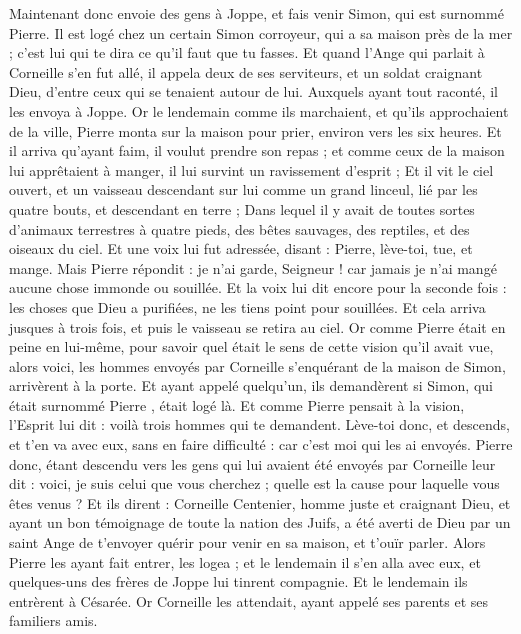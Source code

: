 \begin{multicols}{2}
Maintenant donc envoie des gens à Joppe, et fais venir Simon, qui est surnommé Pierre.
Il est logé chez un certain Simon corroyeur, qui a sa maison près de la mer ; c'est lui qui te dira ce qu'il faut que tu fasses.
Et quand l'Ange qui parlait à Corneille s'en fut allé, il appela deux de ses serviteurs, et un soldat craignant Dieu, d'entre ceux qui se tenaient autour de lui.
Auxquels ayant tout raconté, il les envoya à Joppe.
Or le lendemain comme ils marchaient, et qu'ils approchaient de la ville, Pierre monta sur la maison pour prier, environ vers les six heures.
Et il arriva qu'ayant faim, il voulut prendre son repas ; et comme ceux de la maison lui apprêtaient à manger, il lui survint un ravissement d'esprit ;
Et il vit le ciel ouvert, et un vaisseau descendant sur lui comme un grand linceul, lié par les quatre bouts, et descendant en terre ;
Dans lequel il y avait de toutes sortes d'animaux terrestres à quatre pieds, des bêtes sauvages, des reptiles, et des oiseaux du ciel.
Et une voix lui fut adressée, disant : Pierre, lève-toi, tue, et mange.
Mais Pierre répondit : je n'ai garde, Seigneur ! car jamais je n'ai mangé aucune chose immonde ou souillée.
Et la voix lui dit encore pour la seconde fois : les choses que Dieu a purifiées, ne les tiens point pour souillées.
Et cela arriva jusques à trois fois, et puis le vaisseau se retira au ciel.
Or comme Pierre était en peine en lui-même, pour savoir quel était le sens de cette vision qu'il avait vue, alors voici, les hommes envoyés par Corneille s'enquérant de la maison de Simon, arrivèrent à la porte.
Et ayant appelé quelqu'un, ils demandèrent si Simon, qui était surnommé Pierre , était logé là.
Et comme Pierre pensait à la vision, l'Esprit lui dit : voilà trois hommes qui te demandent.
Lève-toi donc, et descends, et t'en va avec eux, sans en faire difficulté : car c'est moi qui les ai envoyés.
Pierre donc, étant descendu vers les gens qui lui avaient été envoyés par Corneille leur dit : voici, je suis celui que vous cherchez ; quelle est la cause pour laquelle vous êtes venus ?
Et ils dirent : Corneille Centenier, homme juste et craignant Dieu, et ayant un bon témoignage de toute la nation des Juifs, a été averti de Dieu par un saint Ange de t'envoyer quérir pour venir en sa maison, et t'ouïr parler.
Alors Pierre les ayant fait entrer, les logea ; et le lendemain il s'en alla avec eux, et quelques-uns des frères de Joppe lui tinrent compagnie.
Et le lendemain ils entrèrent à Césarée. Or Corneille les attendait, ayant appelé ses parents et ses familiers amis.

\end{multicols}
